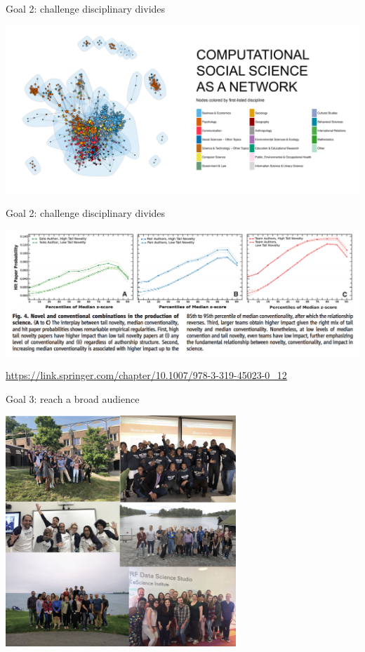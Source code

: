 \documentclass{beamer}
\def\vf{\vfill}
\begin{document}
\begin{frame}{Goal 2: challenge disciplinary divides}

\begin{center}
\includegraphics[width=1.0\textwidth]{figures/colore_by_nodes_arial.png}
\end{center}



\end{frame}

\begin{frame}{Goal 2: challenge disciplinary divides}

\begin{center}
\includegraphics[width=1.0\textwidth]{figures/impact.png}
\end{center}

\vf
\tiny{\url{https://link.springer.com/chapter/10.1007/978-3-319-45023-0_12}}
\end{frame}

\begin{frame}{Goal 3: reach a broad audience}

\begin{center}
\includegraphics[width=0.65\textwidth]{figures/sicss_collage.png}
\end{center}

\end{frame}
\end{document}
